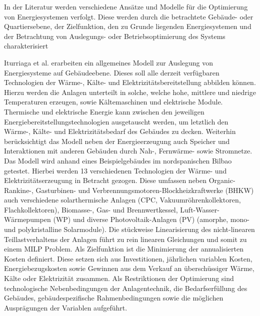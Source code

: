In der Literatur werden verschiedene Ansätze und Modelle für die Optimierung von Energiesystemen verfolgt.
Diese werden durch die betrachtete Gebäude- oder Quartiersebene, der Zielfunktion, den zu Grunde liegenden Energiesystemen und der Betrachtung von Auslegungs- oder Betriebsoptimierung des Systems charakterisiert

Iturriaga et al. \cite{Iturriaga.2017} erarbeiten ein allgemeines Modell zur Auslegung von Energiesysteme auf Gebäudeebene. 
Dieses soll alle derzeit verfügbaren Technologien der Wärme-, Kälte- und Elektrizitätsbereitstellung abbilden können.
Hierzu werden die Anlagen unterteilt in solche, welche hohe, mittlere und niedrige Temperaturen erzeugen, sowie Kältemaschinen und elektrische Module.
Thermische und elektrische Energie kann zwischen den jeweiligen Energiebereitstellungstechnologien ausgetauscht werden, um letztlich den Wärme-, Kälte- und Elektrizitätsbedarf des Gebäudes zu decken.
Weiterhin berücksichtigt das Modell neben der Energieerzeugung auch Speicher und Interaktionen mit anderen Gebäuden durch Nah-, Fernwärme- sowie Stromnetze.
Das Modell wird anhand eines Beispielgebäudes im nordspanischen Bilbao getestet.
Hierbei werden 13 verschiedenen Technologien der Wärme- und Elektrizitätserzeugung in Betracht gezogen.
Diese umfassen neben Organic-Rankine-, Gasturbinen- und Verbrennungsmotoren-Blockheizkraftwerke (BHKW) auch verschiedene solarthermische Anlagen (CPC, Vakuumröhrenkollektoren, Flachkollektoren), Biomasse-, Gas- und Brennwertkessel, Luft-Wasser-Wärmepumpen (WP) und diverse Photovoltaik-Anlagen (PV) (amorphe, mono- und polykristalline Solarmodule).
Die stückweise Linearisierung des nicht-linearen Teillastverhaltens der Anlagen führt zu rein linearen Gleichungen und somit zu einem MILP Problem.
Als Zielfunktion ist die Minimierung der annualisierten Kosten definiert. 
Diese setzen sich aus Investitionen, jährlichen variablen Kosten, Energiebezugskosten sowie Gewinnen aus dem Verkauf an überschüssiger Wärme, Kälte oder Elektrizität zusammen.
Als Restriktionen der Optimierung sind technologische Nebenbedingungen der Anlagentechnik, die Bedarfserfüllung des Gebäudes, gebäudespezifische Rahmenbedingungen sowie die möglichen Ausprägungen der Variablen aufgeführt.

